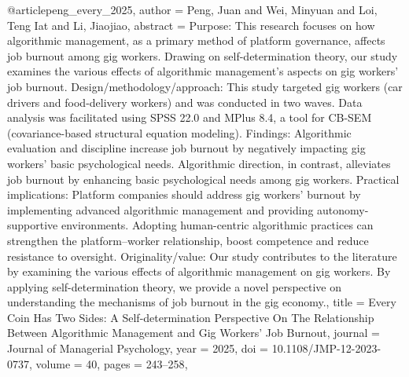 @article{peng_every_2025,
  author = {Peng, Juan and Wei, Minyuan and Loi, Teng Iat and Li, Jiaojiao},
  abstract = {Purpose: This research focuses on how algorithmic management, as a primary method of platform governance, affects job burnout among gig workers. Drawing on self-determination theory, our study examines the various effects of algorithmic management’s aspects on gig workers' job burnout. Design/methodology/approach: This study targeted gig workers (car drivers and food-delivery workers) and was conducted in two waves. Data analysis was facilitated using SPSS 22.0 and MPlus 8.4, a tool for CB-SEM (covariance-based structural equation modeling). Findings: Algorithmic evaluation and discipline increase job burnout by negatively impacting gig workers' basic psychological needs. Algorithmic direction, in contrast, alleviates job burnout by enhancing basic psychological needs among gig workers. Practical implications: Platform companies should address gig workers’ burnout by implementing advanced algorithmic management and providing autonomy-supportive environments. Adopting human-centric algorithmic practices can strengthen the platform–worker relationship, boost competence and reduce resistance to oversight. Originality/value: Our study contributes to the literature by examining the various effects of algorithmic management on gig workers. By applying self-determination theory, we provide a novel perspective on understanding the mechanisms of job burnout in the gig economy.},
  title = {{Every} {Coin} {Has} {Two} {Sides}: {A} {Self-determination} {Perspective} {On} {The} {Relationship} {Between} {Algorithmic} {Management} {and} {Gig} {Workers’} {Job} {Burnout}},
  journal = {Journal of Managerial Psychology},
  year = {2025},
  doi = {10.1108/JMP-12-2023-0737},
  volume = {40},
  pages = {243--258},
}

